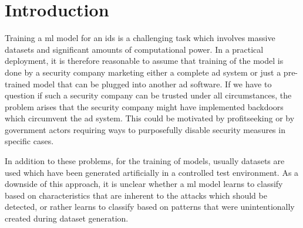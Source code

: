 \documentclass[9pt,sigconf,letterpaper,dvipsnames\ifx\removeHeaders\tempYes ,nonacm\fi]{acmart}
\begin{document}

\maketitle

\section{Introduction}

Training a \gls{ml} model for an \gls{ids} is a challenging task which involves massive datasets and significant amounts of computational power. In a practical deployment, it is therefore reasonable to assume that training of the model is done by a security company marketing either a complete \gls{ad} system or just a pre-trained model that can be plugged into another \gls{ad} software. %
If we have to question if such a security company can be trusted under all circumstances, the problem arises that the security company might have implemented backdoors which circumvent the \gls{ad} system. This could be motivated by profitseeking or by government actors requiring ways to purposefully disable security measures in specific cases.

In addition to these problems, for the training of models, usually datasets are used which have been generated artificially in a controlled test environment. As a downside of this approach, it is unclear whether a \gls{ml} model learns to classify based on characteristics that are inherent to the attacks which should be detected, or rather learns to classify based on patterns that were unintentionally created during dataset generation.
\end{document}
